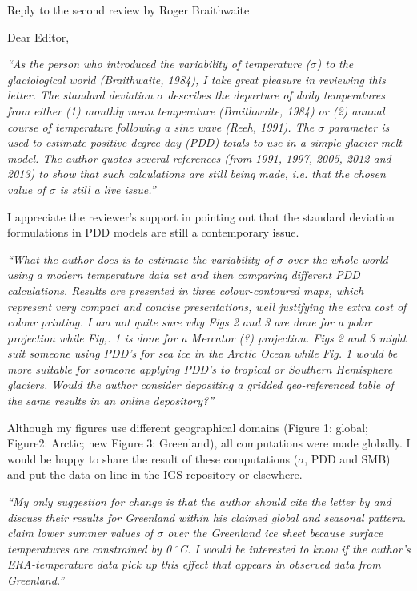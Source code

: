 \documentclass{letter}
\newcommand{\rev}[0]{\color{blue!50!black}\it}
\newcommand{\textrev}[1]{{\rev``#1''}}
\begin{document}
\begin{letter}{Reply to the second review by Roger Braithwaite}

\opening{Dear Editor,}

\textrev{As the person who introduced the variability of temperature ($\sigma$) to the glaciological world (Braithwaite, 1984), I take great pleasure in reviewing this letter. The standard deviation $\sigma$ describes the departure of daily temperatures from either (1) monthly mean temperature (Braithwaite, 1984) or (2) annual course of temperature following a sine wave (Reeh, 1991). The $\sigma$ parameter is used to estimate positive degree-day (PDD) totals to use in a simple glacier melt model. The author quotes several references (from 1991, 1997, 2005, 2012 and 2013) to show that such calculations are still being made, i.e. that the chosen value of $\sigma$ is still a live issue.}

I appreciate the reviewer's support in pointing out that the standard deviation formulations in PDD models are still a contemporary issue.

\textrev{What the author does is to estimate the variability of $\sigma$ over the whole world using a modern temperature data set and then comparing different PDD calculations. Results are presented in three colour-contoured maps, which represent very compact and concise presentations, well justifying the extra cost of colour printing. I am not quite sure why Figs 2 and 3 are done for a polar projection while Fig,. 1 is done for a Mercator (?) projection. Figs 2 and 3 might suit someone using PDD’s for sea ice in the Arctic Ocean while Fig. 1 would be more suitable for someone applying PDD’s to tropical or Southern Hemisphere glaciers. Would the author consider depositing a gridded geo-referenced table of the same results in an online depository?}

Although my figures use different geographical domains (Figure 1: global; Figure2: Arctic; new Figure 3: Greenland), all computations were made globally. I would be happy to share the result of these computations ($\sigma$, PDD and SMB) and put the data on-line in the IGS repository or elsewhere.

\textrev{My only suggestion for change is that the author should cite the letter by \citep{fausto-etal-2011} and discuss their results for Greenland within his claimed global and seasonal pattern. \citet{fausto-etal-2011} claim lower summer values of $\sigma$ over the Greenland ice sheet because surface temperatures are constrained by 0 $^\circ$C. I would be interested to know if the author’s ERA-temperature data pick up this effect that appears in observed data from Greenland.}


\end{letter}
\end{document}
